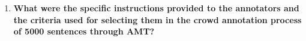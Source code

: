 \begin{enumerate}



    \item 
    [\ding{93}] { \selectfont \textbf{What were the specific instructions provided to the annotators and the criteria used for selecting them in the crowd annotation process of 5000 sentences through AMT?}}
    

\end{enumerate}
